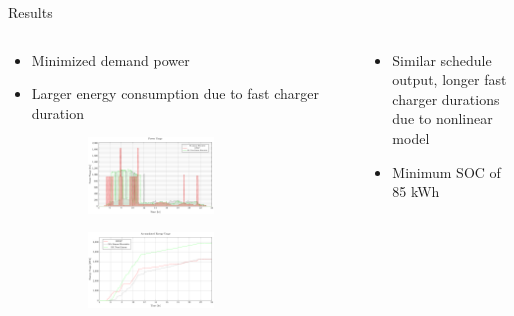 \documentclass[aspectratio=169,dvipsnames]{beamer}
\begin{document}
\begin{frame}[label={sec:org5001cf8}]{Results}
\begin{columns}
\begin{column}{0.5\columnwidth}
{\scriptsize
\begin{itemize}
\item Minimized demand power
\item Larger energy consumption due to fast charger duration
\end{itemize}
}

\begin{figure}
\begin{subfigure}[t]{\textwidth}
\centering
    \includegraphics[width=0.7\textwidth]{img/sa-nonlinear/power-sa-nonlinear}
\end{subfigure}
\begin{subfigure}[t]{\textwidth}
\centering
    \includegraphics[width=0.7\textwidth]{img/sa-nonlinear/energy-sa-nonlinear}
\end{subfigure}
\end{figure}
\end{column}

\begin{column}{0.5\columnwidth}
{\scriptsize
\begin{itemize}
\item Similar schedule output, longer fast charger durations due to nonlinear model
\item Minimum SOC of 85 kWh
\end{itemize}
}


\end{column}
\end{columns}
\end{frame}
\end{document}
